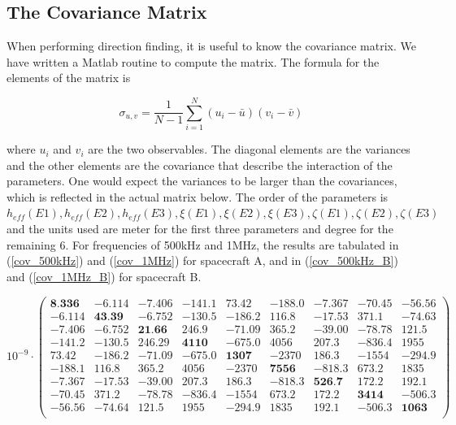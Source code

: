 \documentclass[a4paper,14pt]{extbook}
\begin{document}
\subsection{The Covariance Matrix}
When performing direction finding, it is useful to know the covariance matrix. We have written a Matlab routine to compute the matrix. The formula for the elements of the matrix is

\begin{equation}\label{covariance}
    \sigma_{u,v}=\frac{1}{N-1}\sum_{i=1}^N(u_i-\bar{u})(v_i-\bar{v})
\end{equation}


where $u_i$ and $v_i$ are the two observables. The diagonal elements are the variances and the other elements are the covariance that describe the interaction of the parameters. One would expect the variances to be larger than the covariances, which is reflected in the actual matrix below. The order of the parameters is\\
 $h_{eff}(E1), h_{eff}(E2), h_{eff}(E3), \xi(E1), \xi(E2),\xi(E3),\zeta(E1), \zeta(E2), \zeta(E3)$ and the units used are meter for the first three parameters and degree for the remaining 6. For frequencies of 500kHz and 1MHz, the results are tabulated in (\ref{cov_500kHz}) and (\ref{cov_1MHz}) for spacecraft A, and in (\ref{cov_500kHz_B}) and (\ref{cov_1MHz_B}) for spacecraft B.

\tiny
\begin{equation}\label{cov_500kHz}
10^{-9}\cdot \left(
\begin{array}{ccccccccc}
  \textbf{8.336} & -6.114 & -7.406 & -141.1 & 73.42 & -188.0 & -7.367 & -70.45 & -56.56 \\
-6.114 & \textbf{43.39} & -6.752 & -130.5 & -186.2 & 116.8 & -17.53 & 371.1 & -74.63 \\
-7.406 & -6.752 & \textbf{21.66} & 246.9 & -71.09 & 365.2 & -39.00 & -78.78 & 121.5 \\
 -141.2 & -130.5 & 246.29 & \textbf{4110} & -675.0 & 4056 & 207.3 & -836.4 & 1955 \\
 73.42 & -186.2 & -71.09 & -675.0 & \textbf{1307} & -2370 & 186.3 & -1554 & -294.9 \\
 -188.1 & 116.8 & 365.2 & 4056 & -2370 & \textbf{7556} & -818.3 & 673.2 & 1835 \\
 -7.367 & -17.53 & -39.00 & 207.3 & 186.3 & -818.3 & \textbf{526.7} & 172.2 & 192.1 \\
 -70.45 & 371.2 & -78.78 & -836.4 & -1554 & 673.2 & 172.2 & \textbf{3414} & -506.3 \\
 -56.56 & -74.64 & 121.5 & 1955 & -294.9 & 1835 & 192.1 & -506.3 & \textbf{1063} \\
\end{array}%
\right)
\end{equation}
\normalsize
\end{document}
